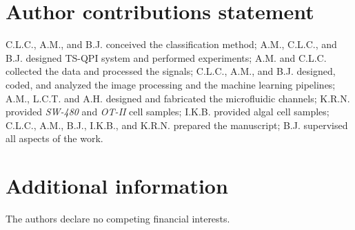 \documentclass[aps,pra,reprint,longbibliography,superscriptaddress]{revtex4-1}
\begin{document}
\section*{Author contributions statement}

C.L.C., A.M., and B.J. conceived the classification method; A.M., C.L.C., and B.J. designed TS-QPI system and performed experiments; A.M. and C.L.C. collected the data and processed the signals; C.L.C., A.M., and B.J. designed, coded, and analyzed the image processing and the machine learning pipelines; A.M., L.C.T. and A.H. designed and fabricated the microfluidic channels; K.R.N. provided \textit{SW-480} and \textit{OT-II} cell samples; I.K.B. provided algal cell samples; C.L.C., A.M., B.J., I.K.B., and K.R.N. prepared the manuscript; B.J. supervised all aspects of the work.

\section*{Additional information}

The authors declare no competing financial interests.
\end{document}
